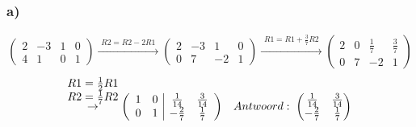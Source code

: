 \documentclass[11pt]{article}
\begin{document}
\subsubsection*{a)}
\[
\left(
\begin{array}{cc|cc}
2 & -3 & 1 & 0 \\
4 & 1 & 0 & 1
\end{array}
\right)
\overset{\begin{matrix}
  R2 = R2-2R1
 \end{matrix}}{\rightarrow}
 \left(
\begin{array}{cc|cc}
2 & -3 & 1 & 0 \\
0 & 7 & -2 & 1
\end{array}
\right)
\overset{\begin{matrix}
  R1 = R1+\frac{3}{7}R2
 \end{matrix}}{\rightarrow}
  \left(
\begin{array}{cc|cc}
2 & 0 & \frac{1}{7} & \frac{3}{7} \\
0 & 7 & -2 & 1
\end{array}
\right)
\]
\[
\overset{\begin{matrix}
  R1 = \frac{1}{2}R1\\
  R2 = \frac{1}{7}R2
 \end{matrix}}{\rightarrow}
   \left(
\begin{array}{cc|cc}
1 & 0 & \frac{1}{14} & \frac{3}{14} \\
0 & 1 & -\frac{2}{7} & \frac{1}{7}
\end{array}
\right)
\\\;\;\; Antwoord: \;
\begin{pmatrix}
\frac{1}{14} & \frac{3}{14} \\
-\frac{2}{7} & \frac{1}{7}
\end{pmatrix}
\]
\end{document}
